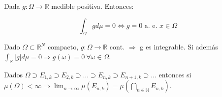 \begin{ejer}
  Dada $g : \Omega \rightarrow \mathbb R$ medible positiva. Entonces:

  $$\int_{\Omega} g d \mu = 0 \Leftrightarrow g = 0 \text{ a. e. } x \in \Omega$$
\end{ejer}

\begin{ejer}
  Dado $\Omega \subset \mathbb R^N \text{ compacto, } g: \Omega \rightarrow \mathbb R \text{ cont. } \Rightarrow$ g es integrable. Si además $\int_{\mathbb R} |g| d \mu = 0 \Rightarrow g(\omega) = 0 \ \forall \omega \in \Omega$.
\end{ejer}

\begin{ejer}
  Dados $\Omega \supset E_{1,k} \supset E_{2,k} \supset \hdots \supset E_{n,k} \supset
  E_{n+1,k} \supset \hdots$ entonces si $\mu(\Omega) < \infty \Rightarrow
  \lim_{n\to\infty} \mu(E_{n,k}) = \mu(\bigcap_{n \in \mathbb N}
  E_{n,k})$.
\end{ejer}

